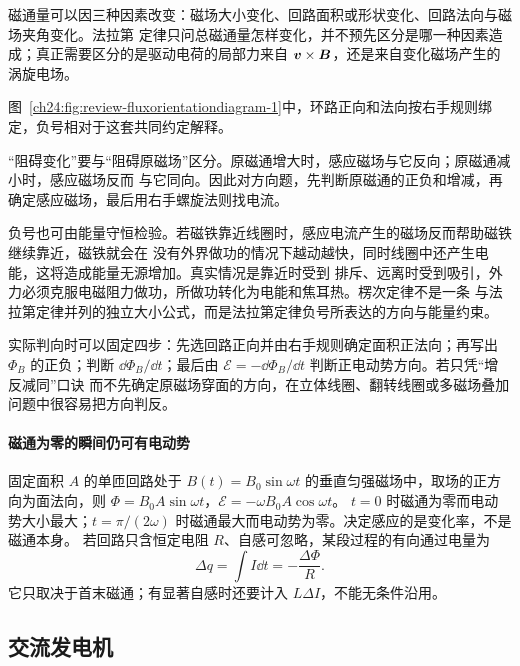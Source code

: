 {磁通量可以因三种因素改变：磁场大小变化、回路面积或形状变化、回路法向与磁场夹角变化。法拉第
定律只问总磁通量怎样变化，并不预先区分是哪一种因素造成；真正需要区分的是驱动电荷的局部力来自
$\bm{v}\times\bm{B}$，还是来自变化磁场产生的涡旋电场。

图~\ref{ch24:fig:review-fluxorientationdiagram-1}中，环路正向和法向按右手规则绑定，负号相对于这套共同约定解释。
\par\noindent\begin{minipage}{\linewidth}
\fluxOrientationDiagram
{}
\end{minipage}\par\medskip

“阻碍变化”要与“阻碍原磁场”区分。原磁通增大时，感应磁场与它反向；原磁通减小时，感应磁场反而
与它同向。因此对方向题，先判断原磁通的正负和增减，再确定感应磁场，最后用右手螺旋法则找电流。

负号也可由能量守恒检验。若磁铁靠近线圈时，感应电流产生的磁场反而帮助磁铁继续靠近，磁铁就会在
没有外界做功的情况下越动越快，同时线圈中还产生电能，这将造成能量无源增加。真实情况是靠近时受到
排斥、远离时受到吸引，外力必须克服电磁阻力做功，所做功转化为电能和焦耳热。楞次定律不是一条
与法拉第定律并列的独立大小公式，而是法拉第定律负号所表达的方向与能量约束。

实际判向时可以固定四步：先选回路正向并由右手规则确定面积正法向；再写出 $\Phi_B$ 的正负；判断
$\dd\Phi_B/\dd t$；最后由 $\mathcal E=-\dd\Phi_B/\dd t$ 判断正电动势方向。若只凭“增反减同”口诀
而不先确定原磁场穿面的方向，在立体线圈、翻转线圈或多磁场叠加问题中很容易把方向判反。


\paragraph{磁通为零的瞬间仍可有电动势}
固定面积 $A$ 的单匝回路处于 $B(t)=B_0\sin\omega t$ 的垂直匀强磁场中，取场的正方向为面法向，则
$\Phi=B_0A\sin\omega t$，$\mathcal E=-\omega B_0A\cos\omega t$。
$t=0$ 时磁通为零而电动势大小最大；$t=\pi/(2\omega)$ 时磁通最大而电动势为零。决定感应的是变化率，不是磁通本身。
若回路只含恒定电阻 $R$、自感可忽略，某段过程的有向通过电量为
\[
 \Delta q=\int I\dd t=-\frac{\Delta\Phi}{R}.
\]
它只取决于首末磁通；有显著自感时还要计入 $L\Delta I$，不能无条件沿用。


\subsection{交流发电机}


}
